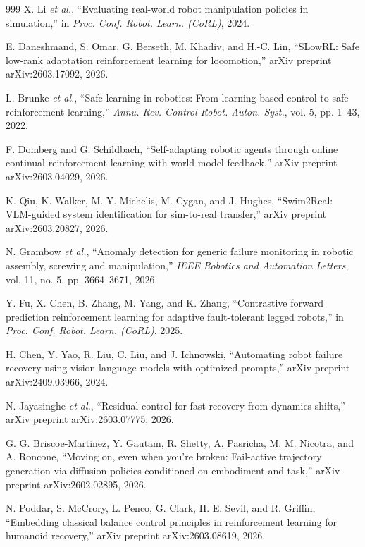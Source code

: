 \documentclass[12pt,a4paper,oneside]{report}
\begin{document}
\begin{thebibliography}{999}
X. Li \textit{et al.}, ``Evaluating real-world robot manipulation policies in simulation,'' in \textit{Proc. Conf. Robot. Learn. (CoRL)}, 2024.

E. Daneshmand, S. Omar, G. Berseth, M. Khadiv, and H.-C. Lin, ``{SLowRL}: Safe low-rank adaptation reinforcement learning for locomotion,'' arXiv preprint arXiv:2603.17092, 2026.

L. Brunke \textit{et al.}, ``Safe learning in robotics: From learning-based control to safe reinforcement learning,'' \textit{Annu. Rev. Control Robot. Auton. Syst.}, vol. 5, pp. 1--43, 2022.

F. Domberg and G. Schildbach, ``Self-adapting robotic agents through online continual reinforcement learning with world model feedback,'' arXiv preprint arXiv:2603.04029, 2026.

K. Qiu, K. Walker, M. Y. Michelis, M. Cygan, and J. Hughes, ``Swim2Real: VLM-guided system identification for sim-to-real transfer,'' arXiv preprint arXiv:2603.20827, 2026.

N. Grambow \textit{et al.}, ``Anomaly detection for generic failure monitoring in robotic assembly, screwing and manipulation,'' \textit{IEEE Robotics and Automation Letters}, vol. 11, no. 5, pp. 3664--3671, 2026.

Y. Fu, X. Chen, B. Zhang, M. Yang, and K. Zhang, ``Contrastive forward prediction reinforcement learning for adaptive fault-tolerant legged robots,'' in \textit{Proc. Conf. Robot. Learn. (CoRL)}, 2025.

H. Chen, Y. Yao, R. Liu, C. Liu, and J. Ichnowski, ``Automating robot failure recovery using vision-language models with optimized prompts,'' arXiv preprint arXiv:2409.03966, 2024.

N. Jayasinghe \textit{et al.}, ``Residual control for fast recovery from dynamics shifts,'' arXiv preprint arXiv:2603.07775, 2026.

G. G. Briscoe-Martinez, Y. Gautam, R. Shetty, A. Pasricha, M. M. Nicotra, and A. Roncone, ``Moving on, even when you're broken: Fail-active trajectory generation via diffusion policies conditioned on embodiment and task,'' arXiv preprint arXiv:2602.02895, 2026.

N. Poddar, S. McCrory, L. Penco, G. Clark, H. E. Sevil, and R. Griffin, ``Embedding classical balance control principles in reinforcement learning for humanoid recovery,'' arXiv preprint arXiv:2603.08619, 2026.


\end{thebibliography}
\end{document}
